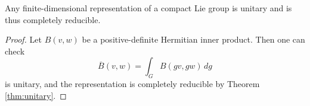 \begin{theorem}
  Any finite-dimensional representation
  of a compact Lie group is unitary and is
  thus completely reducible.
\end{theorem}

\begin{proof}
  Let $B(v, w)$ be a positive-definite
  Hermitian inner product. Then
  one can check
  \[
    \overline{B}(v, w)
    = \int_G B(g v, g w)\, dg
  \]
  is unitary, and the representation is
  completely reducible by Theorem
  \ref{thm:unitary}.
\end{proof}
